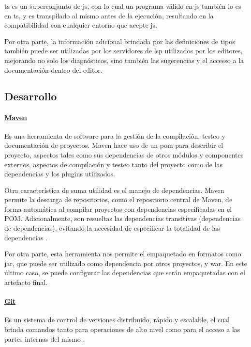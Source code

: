 \acrshort{ts} es un superconjunto de \acrlong{js}, con lo cual un programa válido en \acrshort{js} también lo es en \acrshort{ts}, y es transpilado al mismo antes de la ejecución, resultando en la compatibilidad con cualquier entorno que acepte \acrlong{js}.

Por otra parte, la información adicional brindada por las definiciones de tipos también puede ser utilizadas por los servidores de \acrfull{lsp} utilizados por los editores, mejorando no solo los diagnósticos, sino también las sugerencias y el accesso a la documentación dentro del editor.

\subsection{Desarrollo}

\paragraph{\href{https://maven.apache.org/}{Maven}}\label{para:maven}
Es una herramienta de software para la gestión de la compilación, testeo y documentación de proyectos. Maven hace uso de un \acrfull{pom} para describir el proyecto, aspectos tales como sus dependencias de otros módulos y componentes externos, aspectos de compilación y testeo tanto del proyecto como de las dependencias y los plugins utilizados.

Otra característica de suma utilidad es el manejo de dependencias. Maven permite la descarga de repositorios, como el repositorio central de Maven, de forma automática al compilar proyectos con dependencias especificadas en el POM. Adicionalmente, son resueltas las dependencias transitivas (dependencias de dependencias), evitando la necesidad de especificar la totalidad de las dependencias \cite{sonatypeMaven}.

Por otra parte, esta herramienta nos permite el empaquetado en formatos como \acrfull{jar}, que puede ser utilizado como dependencia por otros proyectos, y \acrfull{war}. En este último caso, se puede configurar las dependencias que serán empaquetadas con el artefacto final.

\paragraph{\href{https://git-scm.com/}{Git}}
Es un sistema de control de versiones distribuido, rápido y escalable, el cual brinda comandos tanto para operaciones de alto nivel como para el acceso a las partes internas del mismo \cite{gitDocs}.

